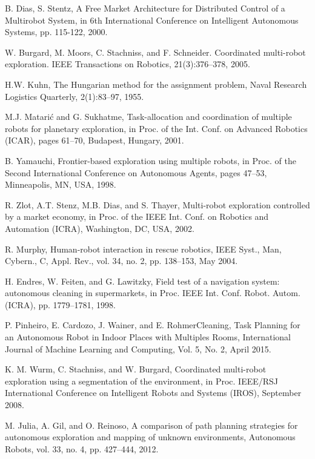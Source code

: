 \documentclass[letterpaper, 10 pt, conference]{ieeeconf}  %
\begin{document}
\newpage
\begin{thebibliography}{99}

 B. Dias, S. Stentz, A Free Market Architecture for Distributed Control of a Multirobot System, in 6th International Conference on Intelligent Autonomous Systems, pp. 115-122, 2000.

 W. Burgard, M. Moors, C. Stachniss, and F. Schneider. Coordinated multi-robot exploration. IEEE Transactions on Robotics, 21(3):376–378, 2005.

 H.W. Kuhn, The Hungarian method for the assignment problem, Naval Research Logistics Quarterly, 2(1):83–97, 1955.

 M.J. Matarić and G. Sukhatme, Task-allocation and coordination of multiple robots for planetary exploration, in Proc. of the Int. Conf. on Advanced Robotics (ICAR), pages 61–70, Budapest, Hungary, 2001.

 B. Yamauchi, Frontier-based exploration using multiple robots, in Proc. of the Second International Conference on Autonomous Agents, pages 47–53, Minneapolis, MN, USA, 1998.

 R. Zlot, A.T. Stenz, M.B. Dias, and S. Thayer, Multi-robot exploration controlled by a market economy, in Proc. of the IEEE Int. Conf. on Robotics and Automation (ICRA), Washington, DC, USA, 2002.

 R. Murphy, Human-robot interaction in rescue robotics, IEEE Syst., Man, Cybern., C, Appl. Rev., vol. 34, no. 2, pp. 138–153, May 2004.

 H. Endres, W. Feiten, and G. Lawitzky, Field test of a navigation system: autonomous cleaning in supermarkets, in Proc. IEEE Int. Conf. Robot. Autom. (ICRA), pp. 1779–1781, 1998.

 P. Pinheiro, E. Cardozo, J. Wainer, and E. RohmerCleaning, Task Planning for an Autonomous Robot in Indoor Places with Multiples Rooms, International Journal of Machine Learning and Computing, Vol. 5, No. 2, April 2015.

 K. M. Wurm, C. Stachniss, and W. Burgard, Coordinated multi-robot exploration using a segmentation of the environment, in Proc. IEEE/RSJ  International Conference on Intelligent Robots and Systems (IROS), September 2008.

 M. Julia, A. Gil, and O. Reinoso, A comparison of path planning strategies for autonomous exploration and mapping of unknown environments, Autonomous Robots, vol. 33, no. 4, pp. 427–444, 2012. 


\end{thebibliography}
\end{document}

